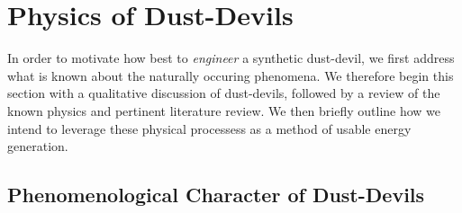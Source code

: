 \section{Physics of Dust-Devils}
\label{sec:physics}


In order to motivate how best to \textit{engineer} a synthetic
dust-devil, we first address what is known about the naturally occuring
phenomena. We therefore begin this section with a qualitative discussion
of dust-devils, followed by a review of the known physics and pertinent 
literature review. We then briefly outline how we intend to leverage
these physical processess as a method of usable energy generation. 


\subsection{Phenomenological Character of Dust-Devils}


